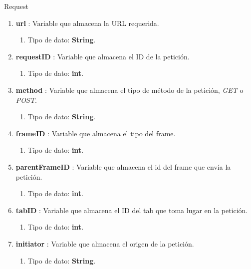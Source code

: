 \documentclass[12pt, a4paper, titlepage]{report}
\begin{document}
			    \large Request
			    \begin{enumerate}
    		        \item \textbf{url} : Variable que almacena la URL requerida.
    		        \begin{enumerate}
    		            \item Tipo de dato: \textbf{String}.
    		        \end{enumerate}
    		        \item \textbf{requestID} : Variable que almacena el ID de la petición.
    		        \begin{enumerate}
    		            \item Tipo de dato: \textbf{int}.
    		        \end{enumerate}
    		        \item \textbf{method} : Variable que almacena el tipo de método de la petición, \textit{GET} o \textit{POST}.
    		        \begin{enumerate}
    		            \item Tipo de dato: \textbf{String}.
    		        \end{enumerate}
    		        \item \textbf{frameID} : Variable que almacena el tipo del frame.
    		        \begin{enumerate}
    		            \item Tipo de dato: \textbf{int}.
    		        \end{enumerate}
    		        \item \textbf{parentFrameID} : Variable que almacena el id del frame que envía la petición. 
    		        \begin{enumerate}
    		            \item Tipo de dato: \textbf{int}.
    		        \end{enumerate}
    		        \item \textbf{tabID} : Variable que almacena el ID del tab que toma lugar en la petición.
    		        \begin{enumerate}
    		            \item Tipo de dato: \textbf{int}.
    		        \end{enumerate}
    		        \item \textbf{initiator} : Variable que almacena el origen de la petición.
    		        \begin{enumerate}
    		            \item Tipo de dato: \textbf{String}.

\end{enumerate}
\end{enumerate}
\end{document}
